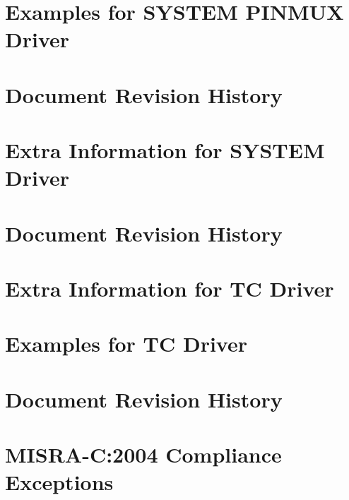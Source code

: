 \let\mypdfximage\pdfximage\def\pdfximage{\immediate\mypdfximage}\documentclass[twoside]{book}
\newcommand{\+}{\discretionary{\mbox{\scriptsize$\hookleftarrow$}}{}{}}
\begin{document}
\chapter{Examples for S\+Y\+S\+T\+EM P\+I\+N\+M\+UX Driver}
\label{asfdoc_sam0_system_pinmux_exqsg}

\chapter{Document Revision History}
\label{asfdoc_sam0_system_pinmux_document_revision_history}

\chapter{Extra Information for S\+Y\+S\+T\+EM Driver}
\label{asfdoc_sam0_system_extra}

\chapter{Document Revision History}
\label{asfdoc_sam0_system_document_revision_history}

\chapter{Extra Information for TC Driver}
\label{asfdoc_sam0_tc_extra}

\chapter{Examples for TC Driver}
\label{asfdoc_sam0_tc_exqsg}

\chapter{Document Revision History}
\label{asfdoc_sam0_tc_document_revision_history}

\chapter{M\+I\+S\+R\+A-\/C\+:2004 Compliance Exceptions}
\label{_c_m_s_i_s__m_i_s_r_a__exceptions}

\end{document}
